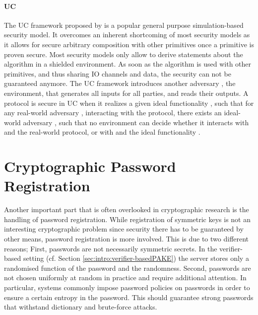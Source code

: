 
\paragraph{\acl{UC}}
The \ac{UC} framework proposed by \citet{Canetti2001a} is a popular general purpose simulation-based security model.
It overcomes an inherent shortcoming of most security models as it allows for secure arbitrary composition with other primitives once a primitive is proven secure.
Most security models only allow to derive statements about the algorithm in a shielded environment.
As soon as the algorithm is used with other primitives, and thus sharing \ac{IO} channels and data, the security can not be guaranteed anymore.
The \ac{UC} framework introduces another adversary \UCZ, the environment, that generates all inputs for all parties, and reads their outputs.
A protocol is secure in \ac{UC} when it realizes a given ideal functionality \UCF, such that for any real-world adversary \A, interacting with the protocol, there exists an ideal-world adversary \UCS, such that no environment \UCZ can decide whether it interacts with \A and the real-world protocol, or with \UCS and the ideal functionality \UCF.


\section{Cryptographic Password Registration}
Another important part that is often overlooked in cryptographic research is the handling of password registration.
While registration of symmetric keys is not an interesting cryptographic problem since security there has to be guaranteed by other means, password registration is more involved.
This is due to two different reasons;
First, passwords are not necessarily symmetric secrets.
In the verifier-based setting (cf. Section \ref{sec:intro:verifier-basedPAKE}) the server stores only a randomised function of the password and the randomness.
Second, passwords are not chosen uniformly at random in practice and require additional attention.
In particular, systems commonly impose password policies on passwords in order to ensure a certain entropy in the password.
This should guarantee strong passwords that withstand dictionary and brute-force attacks.

